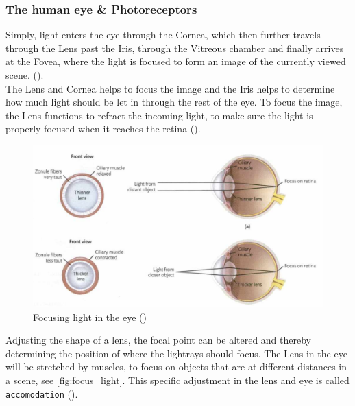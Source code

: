 \documentclass{article}
\newcommand{\goodcite}[1]{ {(\cite{#1})}}
\begin{document}
\subsubsection{The human eye \& Photoreceptors}
Simply, light enters the eye through the Cornea, which then further travels through the Lens past the Iris, through the Vitreous chamber and finally arrives at the Fovea, where the light is focused to form an image of the currently viewed scene.\goodcite{hsp}.\\The Lens and Cornea helps to focus the image and the Iris helps to determine how much light should be let in through the rest of the eye. To focus the image, the Lens functions to refract the incoming light, to make sure the light is properly focused when it reaches the retina\goodcite{hsp}.\medskip \\

\begin{figure}[H]
    \centering
    \includegraphics[width=\textwidth]{img/eyelens.png}
    \caption{Focusing light in the eye\goodcite{hsp}}
    \label{fig:focus_light}
\end{figure}

Adjusting the shape of a lens, the focal point can be altered and thereby determining the position of where the lightrays should focus. The Lens in the eye will be stretched by muscles, to focus on objects that are at different distances in a scene, see \autoref{fig:focus_light}. This specific adjustment in the lens and eye is called \texttt{accomodation}\goodcite{hsp}.\medskip\\
\end{document}
